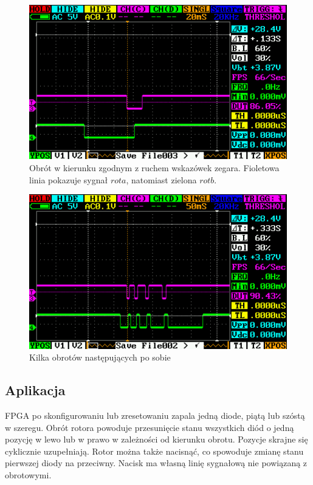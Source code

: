 \documentclass[a4paper,12pt]{article}
\begin{document}
\begin{figure}[htb]
   \centering
   \includegraphics[width=13cm]{grafika/dso/rotor-w-prawo-jeden.png}
   \caption{Obrót w kierunku zgodnym z ruchem wskazówek zegara. Fioletowa linia pokazuje sygnał $rota$, natomiast zielona $rotb$.}
\end{figure}

\begin{figure}[htb]
   \centering
   \includegraphics[width=13cm]{grafika/dso/rotor-w-prawo-wiele.png}
   \caption{Kilka obrotów następujących po sobie}
\end{figure}

\subsection{Aplikacja}

FPGA po skonfigurowaniu lub zresetowaniu zapala jedną diode, piątą lub szóstą w szeregu. Obrót rotora powoduje przesunięcie stanu wszystkich diód o jedną pozycję w lewo lub w prawo w zależności od kierunku obrotu. Pozycje skrajne się cyklicznie uzupełniają. Rotor można także nacisnąć, co spowoduje zmianę stanu pierwszej diody na przeciwny. Nacisk ma własną linię sygnałową nie powiązaną z obrotowymi.
\end{document}
